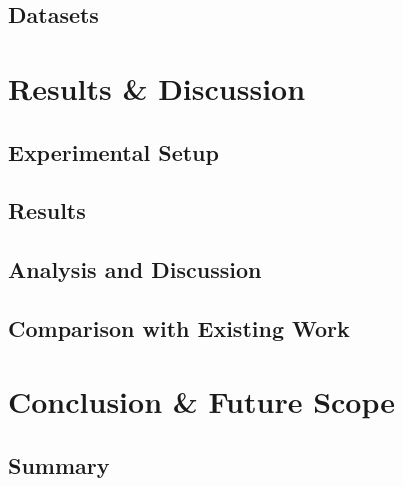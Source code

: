\documentclass[12pt,a4paper]{report}
\numberwithin{equation}{chapter}
\begin{document}
\section{Datasets}

\chapter{Results \& Discussion}
\label{ch:results}


\section{Experimental Setup}

\section{Results}

\section{Analysis and Discussion}

\section{Comparison with Existing Work}

\chapter{Conclusion \& Future Scope}
\label{ch:conclusion}


\section{Summary}
\end{document}
